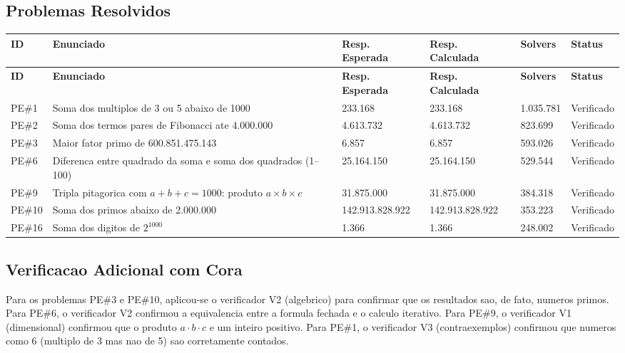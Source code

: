 \subsection{Problemas Resolvidos}

\begin{longtable}{|p{1.0cm}|p{3.0cm}|p{2.5cm}|p{2.0cm}|p{1.5cm}|p{1.5cm}|}
\hline
\textbf{ID} & \textbf{Enunciado} & \textbf{Resp. Esperada} & \textbf{Resp. Calculada} & \textbf{Solvers} & \textbf{Status} \\
\hline
\endfirsthead
\hline
\textbf{ID} & \textbf{Enunciado} & \textbf{Resp. Esperada} & \textbf{Resp. Calculada} & \textbf{Solvers} & \textbf{Status} \\
\hline
\endhead
\hline
\endfoot
PE\#1 & Soma dos multiplos de 3 ou 5 abaixo de 1000 & 233.168 & 233.168 & 1.035.781 & Verificado \\
\hline
PE\#2 & Soma dos termos pares de Fibonacci ate 4.000.000 & 4.613.732 & 4.613.732 & 823.699 & Verificado \\
\hline
PE\#3 & Maior fator primo de 600.851.475.143 & 6.857 & 6.857 & 593.026 & Verificado \\
\hline
PE\#6 & Diferenca entre quadrado da soma e soma dos quadrados (1--100) & 25.164.150 & 25.164.150 & 529.544 & Verificado \\
\hline
PE\#9 & Tripla pitagorica com $a+b+c=1000$: produto $a\times b\times c$ & 31.875.000 & 31.875.000 & 384.318 & Verificado \\
\hline
PE\#10 & Soma dos primos abaixo de 2.000.000 & 142.913.828.922 & 142.913.828.922 & 353.223 & Verificado \\
\hline
PE\#16 & Soma dos digitos de $2^{1000}$ & 1.366 & 1.366 & 248.002 & Verificado \\
\hline
\end{longtable}

\subsection{Verificacao Adicional com Cora}

Para os problemas PE\#3 e PE\#10, aplicou-se o verificador V2 (algebrico) para confirmar que os resultados sao, de fato, numeros primos. Para PE\#6, o verificador V2 confirmou a equivalencia entre a formula fechada e o calculo iterativo. Para PE\#9, o verificador V1 (dimensional) confirmou que o produto $a\cdot b\cdot c$ e um inteiro positivo. Para PE\#1, o verificador V3 (contraexemplos) confirmou que numeros como 6 (multiplo de 3 mas nao de 5) sao corretamente contados.

